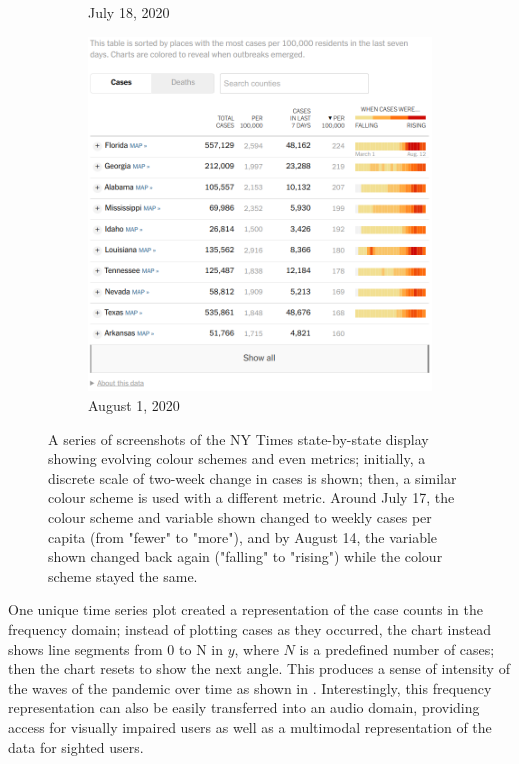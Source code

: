 \documentclass[article]{jdssv}\usepackage[]{graphicx}\usepackage[]{color}
\begin{document}
\begin{figure}
\begin{subfigure}[t]{.25\textwidth}
\caption{July 18, 2020}\label{fig:nyt-colors3}
\end{subfigure}\hfill
\begin{subfigure}[t]{.25\textwidth}
\includegraphics[width=\textwidth]{nyt-wayback-20200814}
\caption{August 1, 2020}\label{fig:nyt-colors4}
\end{subfigure}\hfill
\caption{A series of screenshots of the NY Times state-by-state display showing evolving colour schemes and even metrics; initially, a discrete scale of two-week change in cases is shown; then, a similar colour scheme is used with a different metric. Around July 17, the colour scheme and variable shown changed to weekly cases per capita (from "fewer" to "more"), and by August 14, the variable shown changed back again ("falling" to "rising") while the colour scheme stayed the same.}\label{fig:sparklines-heatmap-nyt}
\end{figure}

One unique time series plot created a representation of the case counts in the frequency domain; instead of plotting cases as they occurred, the chart instead shows line segments from 0 to N in $y$, where $N$ is a predefined number of cases; then the chart resets to show the next angle. This produces a sense of intensity of the waves of the pandemic over time as shown in . Interestingly, this frequency representation can also be easily transferred into an audio domain, providing access for visually impaired users as well as a multimodal representation of the data for sighted users. 
\end{document}
